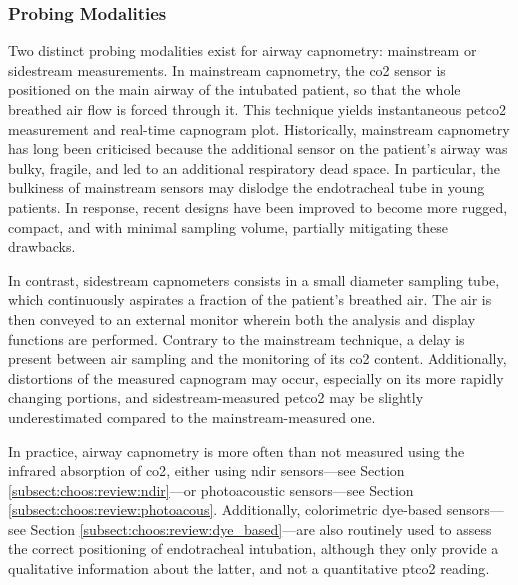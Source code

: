 
\subsubsection{Probing Modalities}

Two distinct probing modalities exist for airway capnometry: mainstream or sidestream measurements. In mainstream capnometry, the \gls{co2} sensor is positioned on the main airway of the intubated patient, so that the whole breathed air flow is forced through it. This technique yields instantaneous \gls{petco2} measurement and real-time capnogram plot. Historically, mainstream capnometry has long been criticised because the additional sensor on the patient's airway was bulky, fragile, and led to an additional respiratory dead space. In particular, the bulkiness of mainstream sensors may dislodge the endotracheal tube in young patients\cite{siobal2016, hochwald2019}. In response, recent designs have been improved to become more rugged, compact, and with minimal sampling volume, partially mitigating these drawbacks\cite{jaffe2002, barter2012}.

In contrast, sidestream capnometers consists in a small diameter sampling tube, which continuously aspirates a fraction of the patient's breathed air. The air is then conveyed to an external monitor wherein both the analysis and display functions are performed. Contrary to the mainstream technique, a delay is present between air sampling and the monitoring of its \gls{co2} content\cite{capnography_gravenstein}. Additionally, distortions of the measured capnogram may occur, especially on its more rapidly changing portions, and sidestream-measured \gls{petco2} may be slightly underestimated compared to the mainstream-measured one\cite{balogh2016}.

In practice, airway capnometry is more often than not measured using the infrared absorption of \gls{co2}, either using \gls{ndir} sensors---see Section \ref{subsect:choos:review:ndir}---or photoacoustic sensors---see Section \ref{subsect:choos:review:photoacous}\cite{capnography_gravenstein, siobal2016}. Additionally, colorimetric dye-based sensors---see Section \ref{subsect:choos:review:dye_based}---are also routinely used to assess the correct positioning of endotracheal intubation, although they only provide a qualitative information about the latter, and not a quantitative \gls{ptco2} reading\cite{nakatani1999}.


